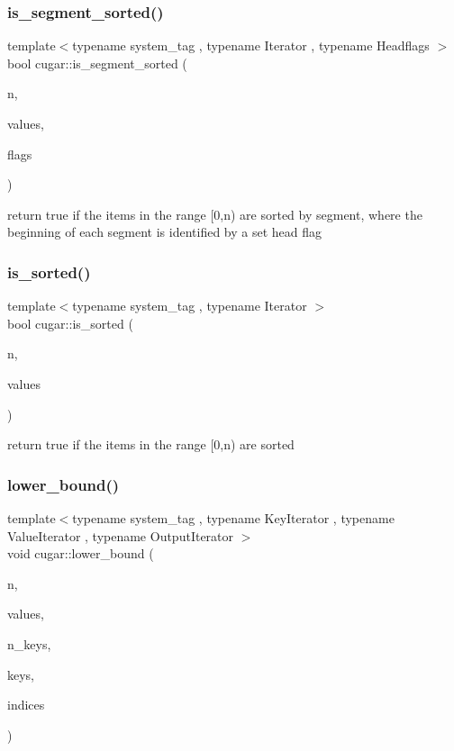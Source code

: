 \subsubsection{\texorpdfstring{is\+\_\+segment\+\_\+sorted()}{is\_segment\_sorted()}}
{\footnotesize\ttfamily template$<$typename system\+\_\+tag , typename Iterator , typename Headflags $>$ \\
bool cugar\+::is\+\_\+segment\+\_\+sorted (\begin{DoxyParamCaption}\item[{const uint32}]{n,  }\item[{const Iterator}]{values,  }\item[{const Headflags}]{flags }\end{DoxyParamCaption})}

return true if the items in the range \mbox{[}0,n) are sorted by segment, where the beginning of each segment is identified by a set head flag \mbox{\label{group___primitives_gaec6f4aab196d418865686901c11a093c}} 
\subsubsection{\texorpdfstring{is\+\_\+sorted()}{is\_sorted()}}
{\footnotesize\ttfamily template$<$typename system\+\_\+tag , typename Iterator $>$ \\
bool cugar\+::is\+\_\+sorted (\begin{DoxyParamCaption}\item[{const uint32}]{n,  }\item[{const Iterator}]{values }\end{DoxyParamCaption})}

return true if the items in the range \mbox{[}0,n) are sorted \mbox{\label{group___primitives_ga9dafac99df89cdd69ff33b9351e8cf7e}} 
\subsubsection{\texorpdfstring{lower\+\_\+bound()}{lower\_bound()}}
{\footnotesize\ttfamily template$<$typename system\+\_\+tag , typename Key\+Iterator , typename Value\+Iterator , typename Output\+Iterator $>$ \\
void cugar\+::lower\+\_\+bound (\begin{DoxyParamCaption}\item[{const uint32}]{n,  }\item[{Value\+Iterator}]{values,  }\item[{const uint32}]{n\+\_\+keys,  }\item[{Key\+Iterator}]{keys,  }\item[{Output\+Iterator}]{indices }\end{DoxyParamCaption})}

